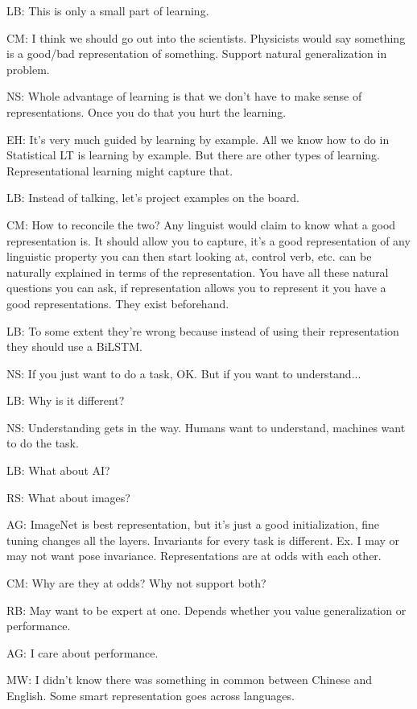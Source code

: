 \begin{enumerate}
LB: This is only a small part of learning.

CM: I think we should go out into the scientists. Physicists would say something is a good/bad representation of something. Support natural generalization in problem. 

NS: Whole advantage of learning is that we don't have to make sense of representations. Once you do that you hurt the learning.

EH: It's very much guided by learning by example. All we know how to do in Statistical LT is learning by example. But there are other types of learning. Representational learning might capture that.

LB: Instead of talking, let's project examples on the board.

CM: How to reconcile the two? Any linguist would claim to know what a good representation is. It should allow you to capture, it's a good representation of any linguistic property you can then start looking at, control verb, etc. can be naturally explained in terms of the representation. You have all these natural questions you can ask, if representation allows you to represent it you have a good representations. 
They exist beforehand.


LB: To some extent they're wrong because instead of using their representation they should use a BiLSTM. 

NS: If you just want to do a task, OK. But if you want to understand...

LB: Why is it different?

NS: Understanding gets in the way. Humans want to understand, machines want to do the task.

LB: What about AI?

RS: What about images?

AG: ImageNet is best representation, but it's just a good initialization, fine tuning changes all the layers.
Invariants for every task is different. Ex. I may or may not want pose invariance. Representations are at odds with each other.

CM: Why are they at odds? Why not support both?

RB: May want to be expert at one. Depends whether you value generalization or performance.

AG: I care about performance.

MW: I didn't know there was something in common between Chinese and English. %
Some smart representation goes across languages.


\end{enumerate}
